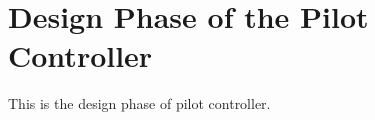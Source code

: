 \section{Design Phase of the Pilot Controller}
This is the design phase of pilot controller.

\newpage